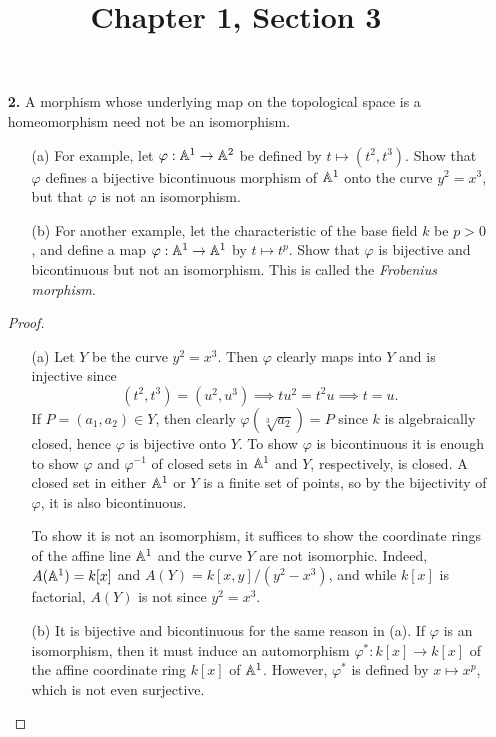\documentclass{article}
\title{Chapter 1, Section 3}
\begin{document}
\maketitle
\begin{enumerate} [label=\textbf{\arabic*.}, leftmargin=-0.05em]

\item[\textbf{2.}] A morphism whose underlying map on the topological space is a homeomorphism need not be an isomorphism.
\begin{itemize}
    \item[(a)] For example, let $\varphi : \mathbb{A}^1 \to \mathbb{A}^2$ be defined by $t \mapsto (t^2, t^3)$. Show that $\varphi$ defines a bijective bicontinuous morphism of $\mathbb{A}^1$ onto the curve $y^2 = x^3$, but that $\varphi$ is not an isomorphism.

    \item[(b)] For another example, let the characteristic of the base field $k$ be $p > 0$, and define a map $\varphi : \mathbb{A}^1 \to \mathbb{A}^1$ by $t \mapsto t^p$. Show that $\varphi$ is bijective and bicontinuous but not an isomorphism. This is called the \textit{Frobenius morphism}.
\end{itemize}

\begin{proof} $ $ \vspace{0pt}
   \begin{itemize} [leftmargin=0cm]
    \item[(a)] Let $Y$ be the curve $y^2 = x^3$. Then $\varphi$ clearly maps into $Y$ and is injective since
    \begin{equation*}
        (t^2, t^3) = (u^2, u^3) \implies tu^2 = t^2u \implies t = u.
    \end{equation*}
    If $P = (a_1, a_2) \in Y$, then clearly $\varphi(\sqrt[3]{a_2}) = P$ since $k$ is algebraically closed, hence $\varphi$ is bijective onto $Y$. To show $\varphi$ is bicontinuous it is enough to show $\varphi$ and $\varphi^{-1}$ of closed sets in $\mathbb{A}^1$ and $Y$, respectively, is closed. A closed set in either $\mathbb{A}^1$ or $Y$ is a finite set of points, so by the bijectivity of $\varphi$, it is also bicontinuous.

    To show it is not an isomorphism, it suffices to show the coordinate rings of the affine line $\mathbb{A}^1$ and the curve $Y$ are not isomorphic. Indeed, $A(\mathbb{A}^1) = k[x]$ and $A(Y) = k[x, y] / (y^2 - x^3)$, and while $k[x]$ is factorial, $A(Y)$ is not since $y^2 = x^3$.

    \item[(b)] It is bijective and bicontinuous for the same reason in (a). If $\varphi$ is an isomorphism, then it must induce an automorphism $\varphi^* : k[x] \to k[x]$ of the affine coordinate ring $k[x]$ of $\mathbb{A}^1$. However, $\varphi^*$ is defined by $x \mapsto x^p$, which is not even surjective.
   \end{itemize} 
\end{proof}


\end{enumerate}
\end{document}
